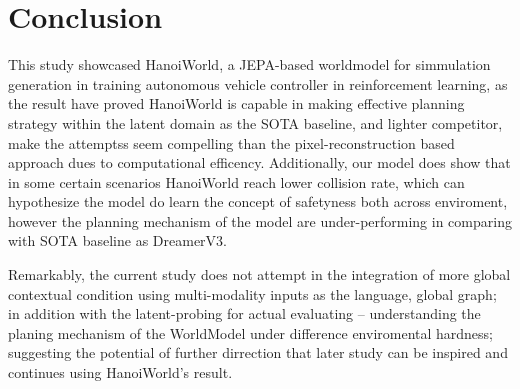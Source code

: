\section{Conclusion}
\label{sec:conclusion}

This study showcased HanoiWorld, a JEPA-based worldmodel for simmulation generation in training autonomous vehicle controller in reinforcement learning, as the result have proved HanoiWorld is capable in making effective planning strategy within the latent domain as the SOTA baseline, and lighter competitor, make the attemptss seem compelling than the pixel-reconstruction based approach dues to computational efficency. Additionally, our model does show that in some certain scenarios HanoiWorld reach lower collision rate, which can hypothesize the model do learn the concept of safetyness both across enviroment, however the planning mechanism of the model are under-performing in comparing with SOTA baseline as DreamerV3.

Remarkably, the current study does not attempt in the integration of more global contextual condition using multi-modality inputs as the language, global graph; in addition with the latent-probing for actual evaluating -- understanding the planing mechanism of the WorldModel under difference enviromental hardness; suggesting the potential of further dirrection that later study can be inspired and continues using HanoiWorld's result.